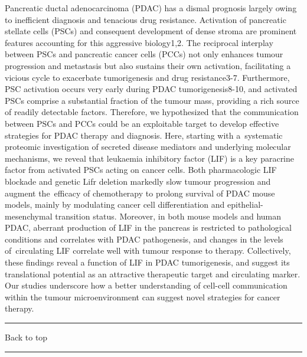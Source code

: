 \documentclass[]{article}
\begin{document}
Pancreatic ductal adenocarcinoma (PDAC) has a dismal prognosis largely
owing to inefficient diagnosis and tenacious drug resistance. Activation
of pancreatic stellate cells (PSCs) and consequent development of dense
stroma are prominent features accounting for this aggressive biology1,2.
The reciprocal interplay between PSCs and pancreatic cancer cells (PCCs)
not only enhances tumour progression and metastasis but also sustains
their own activation, facilitating a vicious cycle to exacerbate
tumorigenesis and drug resistance3-7. Furthermore, PSC activation occurs
very early during PDAC tumorigenesis8-10, and activated PSCs comprise a
substantial fraction of the tumour mass, providing a rich source of
readily detectable factors. Therefore, we hypothesized that the
communication between PSCs and PCCs could be an exploitable target to
develop effective strategies for PDAC therapy and diagnosis. Here,
starting with a~systematic proteomic investigation of secreted disease
mediators and underlying molecular mechanisms, we reveal that leukaemia
inhibitory factor (LIF) is a key paracrine factor from activated PSCs
acting on cancer cells. Both pharmacologic LIF blockade and genetic Lifr
deletion markedly slow tumour progression and augment the~efficacy of
chemotherapy to prolong survival of PDAC mouse models, mainly by
modulating cancer cell differentiation and epithelial-mesenchymal
transition status. Moreover, in both mouse models and human PDAC,
aberrant production of LIF in the pancreas is restricted to pathological
conditions and correlates with PDAC pathogenesis, and changes in the
levels of~circulating LIF correlate well with tumour response to
therapy. Collectively, these findings reveal a function of LIF in PDAC
tumorigenesis, and suggest its translational potential as an attractive
therapeutic target and circulating marker. Our studies underscore how a
better understanding of cell-cell communication within the tumour
microenvironment can suggest novel strategies for cancer therapy.

{}

{}

\begin{center}\rule{0.5\linewidth}{\linethickness}\end{center}

Back to top

\begin{center}\rule{0.5\linewidth}{\linethickness}\end{center}

\pagebreak
\end{document}
